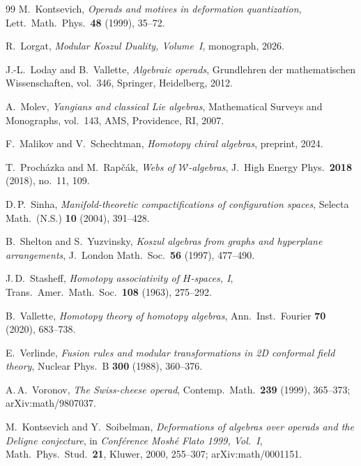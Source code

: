 \documentclass[11pt,reqno]{amsart}
\theoremstyle{definition}
\theoremstyle{remark}
\newcommand{\cW}{\mathcal{W}}
\numberwithin{equation}{section}
\begin{document}
\begin{thebibliography}{99}
M.~Kontsevich,
\textit{Operads and motives in deformation quantization},
Lett.~Math.~Phys.\ \textbf{48} (1999), 35--72.

R.~Lorgat,
\textit{Modular Koszul Duality, Volume~I}, monograph, 2026.

J.-L.~Loday and B.~Vallette,
\textit{Algebraic operads},
Grundlehren der mathematischen Wissenschaften, vol.~346,
Springer, Heidelberg, 2012.

A.~Molev,
\textit{Yangians and classical Lie algebras},
Mathematical Surveys and Monographs, vol.~143,
AMS, Providence, RI, 2007.

F.~Malikov and V.~Schechtman,
\textit{Homotopy chiral algebras},
preprint, 2024.

T.~Proch\'azka and M.~Rap\v{c}\'ak,
\textit{Webs of $\cW$-algebras},
J.~High Energy Phys.\ \textbf{2018} (2018), no.~11, 109.

D.\,P.~Sinha,
\textit{Manifold-theoretic compactifications of configuration
spaces},
Selecta Math.\ (N.S.) \textbf{10} (2004), 391--428.

B.~Shelton and S.~Yuzvinsky,
\textit{Koszul algebras from graphs and hyperplane arrangements},
J.\ London Math.\ Soc.\ \textbf{56} (1997), 477--490.

J.\,D.~Stasheff,
\textit{Homotopy associativity of $H$-spaces, I},
Trans.~Amer.~Math.~Soc.\ \textbf{108} (1963), 275--292.

B.~Vallette,
\textit{Homotopy theory of homotopy algebras},
Ann.~Inst.~Fourier \textbf{70} (2020), 683--738.

E.~Verlinde,
\textit{Fusion rules and modular transformations in 2D conformal
field theory},
Nuclear Phys.~B \textbf{300} (1988), 360--376.

A.\,A.~Voronov,
\textit{The Swiss-cheese operad},
Contemp.\ Math.\ \textbf{239} (1999), 365--373;
arXiv:math/9807037.

M.~Kontsevich and Y.~Soibelman,
\textit{Deformations of algebras over operads and the Deligne
conjecture},
in \emph{Conf\'erence Mosh\'e Flato 1999, Vol.~I}, Math.\ Phys.\
Stud.\ \textbf{21}, Kluwer, 2000, 255--307;
arXiv:math/0001151.

\end{thebibliography}
\end{document}
